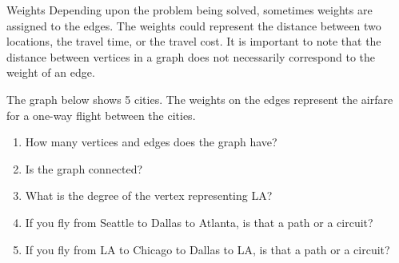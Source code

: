 \begin{definition}{Weights}{}
Depending upon the problem being solved, sometimes weights are assigned to the edges.  The weights could represent the distance between two locations, the travel time, or the travel cost.  It is important to note that the distance between vertices in a graph does not necessarily correspond to the weight of an edge.
 \end{definition}

\begin{learningcheckpoint}{}{}
\label{ex:5cities}
The graph below shows 5 cities.  The weights on the edges represent the airfare for a one-way flight between the cities.
 \begin{enumerate}[label=\alph*.]
 \item How many vertices and edges does the graph have?
 \item Is the graph connected?
 \item What is the degree of the vertex representing LA?
 \item If you fly from Seattle to Dallas to Atlanta, is that a path or a circuit?
 \item If you fly from LA to Chicago to Dallas to LA, is that a path or a circuit?
 \end{enumerate}
 
 \begin{center}
 \end{center}
 \end{learningcheckpoint}


